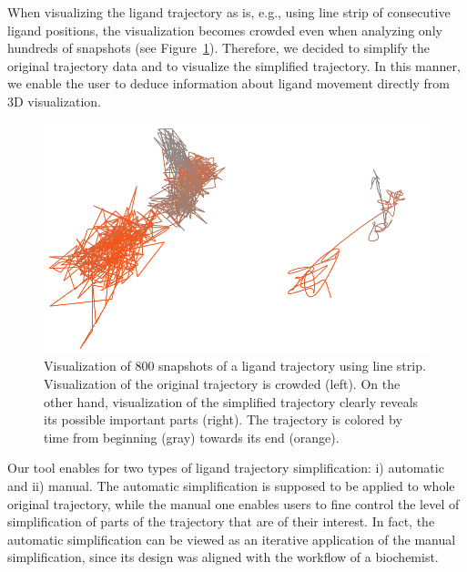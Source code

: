 When visualizing the ligand trajectory as is, e.g., using line strip of consecutive ligand positions, the visualization becomes crowded even when analyzing only hundreds of snapshots (see Figure~\ref{fig:crowded}).
Therefore, we decided to simplify the original trajectory data and to visualize the simplified trajectory.
In this manner, we enable the user to deduce information about ligand movement directly from 3D visualization.

\begin{figure}
	\includegraphics[width=0.95\linewidth]{img/crowded-combined.png}
\caption{Visualization of 800 snapshots of a ligand trajectory using line strip.
Visualization of the original trajectory is crowded (left).
On the other hand, visualization of the simplified trajectory clearly reveals its possible important parts (right).
The trajectory is colored by time from beginning (gray) towards its end (orange).}
\label{fig:crowded}
\end{figure}

Our tool enables for two types of ligand trajectory simplification: i) automatic and ii) manual.
The automatic simplification is supposed to be applied to whole original trajectory, while the manual one enables users to fine control the level of simplification of parts of the trajectory that are of their interest.
In fact, the automatic simplification can be viewed as an iterative application of the manual simplification, since its design was aligned with the workflow of a biochemist.

